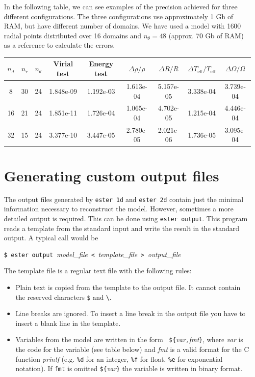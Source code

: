 In the following table, we can see examples of the precision achieved for
three different configurations. The three configurations use approximately
1 Gb of RAM, but have different number of domains. We have used a model
with 1600 radial points distributed over 16 domains and $n_\theta=48$
(approx. 70 Gb of RAM) as a reference to calculate the errors.

\begin{center}
\begin{tabular}{c|c|c||c|c|c|c|c|c}
$n_d$ & $n_r$ & $n_\theta$ & Virial test & Energy test &
$\Delta\rho/\rho$ & $\Delta R/R$ & $\Delta T_\mathrm{eff}/T_\mathrm{eff}$ & $\Delta \Omega/\Omega$ \\
\hline
8 & 30 & 24 & 1.848e-09 & 1.192e-03 & 
1.613e-04 & 5.157e-05 & 3.338e-04 & 3.739e-04 \\
16 & 21 & 24 & 1.851e-11 & 1.726e-04 &
1.065e-04 & 4.702e-05 & 1.215e-04 & 4.446e-04 \\
32 & 15 & 24 & 3.377e-10 & 3.447e-05 &
2.780e-05 & 2.021e-06 & 1.736e-05 & 3.095e-04 \\
\end{tabular}
\end{center}

\section{Generating custom output files}

The output files generated by {\tt ester 1d} and {\tt ester 2d} contain
just the minimal information necessary to reconstruct the model. However,
sometimes a more detailed output is required.  This can be done using
{\tt ester output}. This program reads a template from the standard input
and write the result in the standard output.  A typical call would be

\medskip
\noindent
\verb|$ ester output |{\it model\_file}\verb| < |{\it template\_file}\verb| > |{\it output\_file}

\medskip

The template file is a regular text file with the following rules:

\begin{itemize}
\item Plain text is copied from the template to the output file. It
cannot contain the reserved characters {\tt \$} and {\tt \textbackslash}.

\item Line breaks are ignored. To insert a line break in the output file
you have to insert a blank line in the template.

\item Variables from the model are written in the form \mbox{{\tt
\$\{}{\it var}{\tt ,}{\it fmt}{\tt \}}}, where {\it var} is the code
for the variable (see table below) and {\it fmt} is a valid format for
the C function {\it printf} (e.g. {\tt \%d} for an integer, {\tt \%f}
for float, {\tt \%e} for exponential notation).  If {\tt fmt} is omitted
{\tt\$\{}{\it var}{\tt \}} the variable is written in binary format.

\end{itemize}

